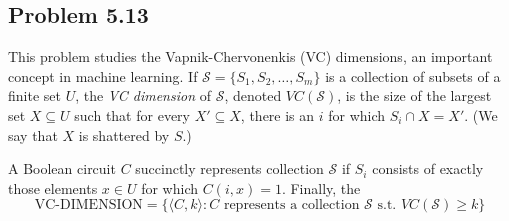\documentclass[a4paper]{article}
\begin{document}
\subsection*{Problem 5.13}

This problem studies the Vapnik-Chervonenkis (VC) dimensions, an important concept in machine learning. If $\mathcal{S} = \{S_1, S_2, \ldots, S_m\}$ is a collection of subsets of a finite set $U$, the \textit{VC dimension} of $\mathcal{S}$, denoted $VC(\mathcal{S})$, is the size of the largest set $X \subseteq U$ such that for every $X' \subseteq X$, there is an $i$ for which $S_i \cap X = X'$. (We say that $X$ is shattered by $S$.)

A Boolean circuit $C$ succinctly represents collection $\mathcal{S}$ if $S_i$ consists of exactly those elements $x \in U$ for which $C(i, x) = 1$. Finally, the
\[
  \text{VC-DIMENSION} = \{\langle C, k \rangle : C \text{ represents a collection } \mathcal{S} \text{ s.t. } VC(\mathcal{S}) \geq k\}
\]
\end{document}
